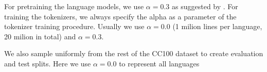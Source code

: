 For pretraining the language models, we use $\alpha = 0.3$ as suggested by \citet{conneau_unsupervised_2020-1}. For training the tokenizers, we always specify the alpha as a parameter of the tokenizer training procedure. Usually we use $\alpha = 0.0$ (1 milion lines per language, 20 milion in total) and $\alpha = 0.3$.

We also sample uniformly from the rest of the CC100 dataset to create evaluation and test splits. Here we use $\alpha = 0.0$ to represent all languages



